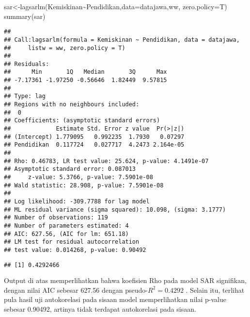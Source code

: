 \documentclass[
]{book}
\newenvironment{Shaded}{\begin{snugshade}}{\end{snugshade}}
\newcommand{\AttributeTok}[1]{\textcolor[rgb]{0.77,0.63,0.00}{#1}}
\newcommand{\DecValTok}[1]{\textcolor[rgb]{0.00,0.00,0.81}{#1}}
\newcommand{\FunctionTok}[1]{\textcolor[rgb]{0.00,0.00,0.00}{#1}}
\newcommand{\NormalTok}[1]{#1}
\newcommand{\OtherTok}[1]{\textcolor[rgb]{0.56,0.35,0.01}{#1}}
\newcommand{\SpecialCharTok}[1]{\textcolor[rgb]{0.00,0.00,0.00}{#1}}
\begin{document}
\begin{Shaded}
\begin{Highlighting}[]
\NormalTok{sar}\OtherTok{\textless{}{-}}\FunctionTok{lagsarlm}\NormalTok{(Kemiskinan}\SpecialCharTok{\textasciitilde{}}\NormalTok{Pendidikan,}\AttributeTok{data=}\NormalTok{datajawa,ww, }\AttributeTok{zero.policy=}\NormalTok{T)}
\FunctionTok{summary}\NormalTok{(sar)}
\end{Highlighting}
\end{Shaded}

\begin{verbatim}
## 
## Call:lagsarlm(formula = Kemiskinan ~ Pendidikan, data = datajawa, 
##     listw = ww, zero.policy = T)
## 
## Residuals:
##      Min       1Q   Median       3Q      Max 
## -7.17361 -1.97250 -0.56646  1.82449  9.57815 
## 
## Type: lag 
## Regions with no neighbours included:
##  0 
## Coefficients: (asymptotic standard errors) 
##             Estimate Std. Error z value  Pr(>|z|)
## (Intercept) 1.779095   0.992235  1.7930   0.07297
## Pendidikan  0.117724   0.027717  4.2473 2.164e-05
## 
## Rho: 0.46783, LR test value: 25.624, p-value: 4.1491e-07
## Asymptotic standard error: 0.087013
##     z-value: 5.3766, p-value: 7.5901e-08
## Wald statistic: 28.908, p-value: 7.5901e-08
## 
## Log likelihood: -309.7788 for lag model
## ML residual variance (sigma squared): 10.098, (sigma: 3.1777)
## Number of observations: 119 
## Number of parameters estimated: 4 
## AIC: 627.56, (AIC for lm: 651.18)
## LM test for residual autocorrelation
## test value: 0.014268, p-value: 0.90492
\end{verbatim}

\begin{Shaded}
\end{Shaded}

\begin{verbatim}
## [1] 0.4292466
\end{verbatim}

Output di atas memperlihatkan bahwa koefisien Rho pada model SAR signifikan, dengan nilai AIC sebesar 627.56 dengan pseudo-\(R^2=0.4292\) . Selain itu, terlihat pula hasil uji autokorelasi pada sisaan model memperlihatkan nilai p-value sebesar 0.90492, artinya tidak terdapat autokorelasi pada sisaan.
\end{document}
